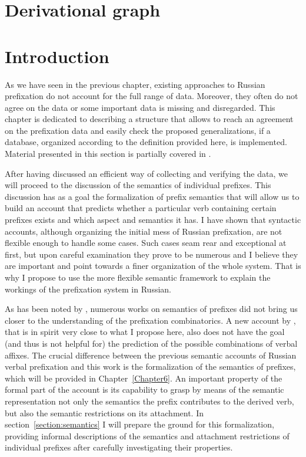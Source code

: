 
\section{Derivational graph}\label{section:graph}

\section{Introduction}
As we have seen in the previous chapter, existing approaches to Russian prefixation do not account for the full range of data. Moreover, they often do not agree on the data or some important data is missing and disregarded. This chapter is dedicated to describing a structure that allows to reach an agreement on the prefixation data and easily check the proposed generalizations, if a database, organized according to the definition provided here, is implemented. Material presented in this section is partially covered in \citet{ZinovaFilip:14b}.

After having discussed an efficient way of collecting and verifying the data, we will proceed to the discussion of the semantics of individual prefixes. This discussion has as a goal the formalization of prefix semantics that will allow us to build an account that predicts whether a particular verb containing certain prefixes exists and which aspect and semantics it has. I have shown that syntactic accounts, although organizing the initial mess of Russian prefixation, are not flexible enough to handle some cases. Such cases seam rear and exceptional at first, but upon careful examination they prove to be numerous and I believe they are important and point towards a finer organization of the whole system. That is why I propose to use the more flexible semantic framework to explain the workings of the prefixation system in Russian.

As has been noted by \citet{Tatevosov:09}, numerous works on semantics of prefixes \citep[][among others]{Avilova:64, Golovin:59, Lopatin:97, Tixonov:98} did not bring us closer to the understanding of the prefixation combinatorics. A new account by \citet{Kagan:book}, that is in spirit very close to what I propose here, also does not have the goal (and thus is not helpful for) the prediction of the possible combinations of verbal affixes. The crucial difference between the previous semantic accounts of Russian verbal prefixation and this work is the formalization of the semantics of prefixes, which will be provided in Chapter~\ref{Chapter6}. An important property of the formal part of the account is its capability to grasp by means of the semantic representation not only the semantics the prefix contributes to the derived verb, but also the semantic restrictions on its attachment. In section~\ref{section:semantics} I will prepare the ground for this formalization, providing informal descriptions of the semantics and attachment restrictions of individual prefixes after carefully investigating their properties. 

